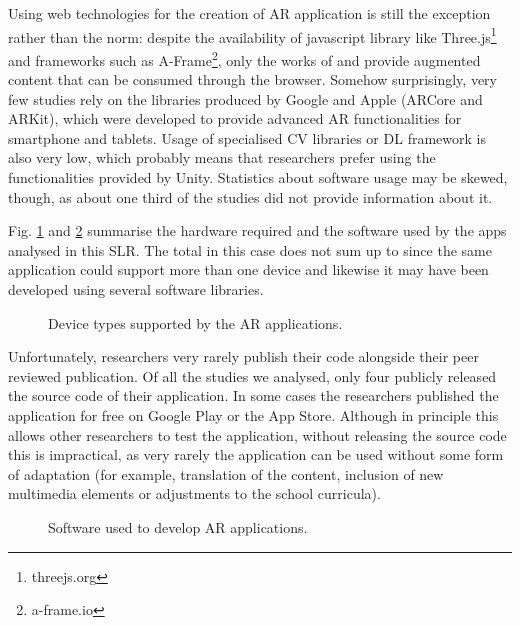 Using web technologies for the creation of AR application is still the exception rather than the norm: despite the availability of javascript library like Three.js\footnote{threejs.org} and frameworks such as A-Frame\footnote{a-frame.io}, only the works of \citet{abriata2020building} and \citet{protopsaltis2016quiz} provide augmented content that can be consumed through the browser.
Somehow surprisingly, very few studies rely on the libraries produced by Google and Apple (ARCore and ARKit), which were developed to provide advanced \gls{AR} functionalities for smartphone and tablets. Usage of specialised \gls{CV} libraries or \gls{DL} framework is also very low, which probably means that researchers prefer using the functionalities provided by Unity. Statistics about software usage may be skewed, though, as about one third of the studies did not provide information about it.

Fig. \ref{fig:hardware} and \ref{fig:software} summarise the hardware required and the software used by the apps analysed in this \gls{SLR}. The total in this case does not sum up to \papersSelected since the same application could support more than one device and likewise it may have been developed using several software libraries.

\begin{figure}[ht]	
	\begin{center}
	
	\caption{Device types supported by the AR applications.}
	\label{fig:hardware}
    \end{center}
\end{figure}

Unfortunately, researchers very rarely publish their code alongside their peer reviewed publication. Of all the studies we analysed, only four \citep{mylonas2019educational, laviole2018nectar, ManriqueJuan2017APA, abriata2020building} publicly released the source code of their application. In some cases the researchers published the application for free on Google Play or the App Store. Although in principle this allows other researchers to test the application, without releasing the source code this is impractical, as very rarely the application can be used without some form of adaptation (for example, translation of the content, inclusion of new multimedia elements or adjustments to the school curricula).

\begin{figure}[ht]	
	\begin{center}
	
	\caption{Software used to develop AR applications.}
	\label{fig:software}
    \end{center}
\end{figure}